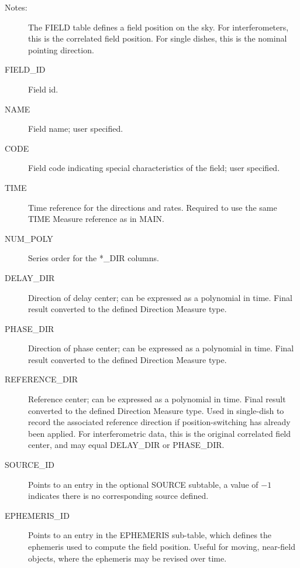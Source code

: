 \documentclass{article}
\begin{document}
\begin{description}

\item[Notes:] The FIELD table defines a field position on the sky. For
interferometers, this is the correlated field position. For single dishes,
this is the nominal pointing direction.

\item[FIELD\_ID] Field id.
\item[NAME] Field name; user specified.

\item[CODE] Field code indicating special characteristics of the
field; user specified.

\item[TIME] Time reference for the directions and rates. Required to
use the same TIME Measure reference as in MAIN.

\item[NUM\_POLY] Series order for the *\_DIR columns.

\item[DELAY\_DIR] Direction of delay center; can be expressed as a
polynomial in time. Final result converted to the defined Direction
Measure type.

\item[PHASE\_DIR] Direction of phase center; can be expressed as a
polynomial in time. Final result converted to the defined Direction
Measure type.

\item[REFERENCE\_DIR] Reference center; can be expressed as a
polynomial in time. Final result converted to the defined Direction
Measure type. Used in single-dish to record the associated reference
direction if position-switching has already been applied. For
interferometric data, this is the original correlated field center,
and may equal DELAY\_DIR or PHASE\_DIR.

\item[SOURCE\_ID] Points to an entry in the optional SOURCE subtable, a
value of $-1$ indicates there is no corresponding source defined.

\item[EPHEMERIS\_ID] Points to an entry in the EPHEMERIS sub-table,
which defines the ephemeris used to compute the field position. Useful
for moving, near-field objects, where the ephemeris may be revised over time.

\end{description}
\end{document}
